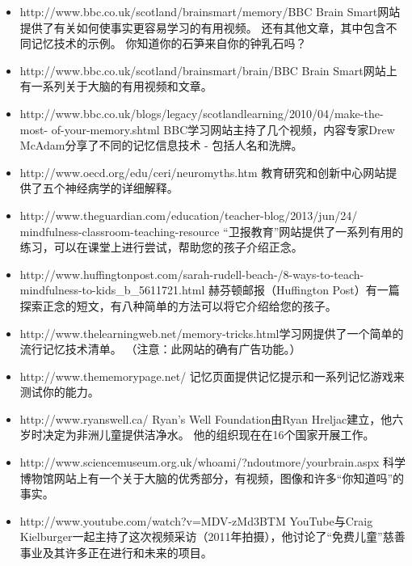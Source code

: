 \begin{itemize}
        \item http://www.bbc.co.uk/scotland/brainsmart/memory/BBC Brain Smart网站提供了有关如何使事实更容易学习的有用视频。 还有其他文章，其中包含不同记忆技术的示例。 你知道你的石笋来自你的钟乳石吗？
        \item http://www.bbc.co.uk/scotland/brainsmart/brain/BBC Brain Smart网站上有一系列关于大脑的有用视频和文章。
        \item http://www.bbc.co.uk/blogs/legacy/scotlandlearning/2010/04/make-the-most- of-your-memory.shtml BBC学习网站主持了几个视频，内容专家Drew McAdam分享了不同的记忆信息技术 - 包括人名和洗牌。
        \item http://www.oecd.org/edu/ceri/neuromyths.htm 教育研究和创新中心网站提供了五个神经病学的详细解释。
        \item http://www.theguardian.com/education/teacher-blog/2013/jun/24/ mindfulness-classroom-teaching-resource “卫报教育”网站提供了一系列有用的练习，可以在课堂上进行尝试，帮助您的孩子介绍正念。
        \item http://www.huffingtonpost.com/sarah-rudell-beach-/8-ways-to-teach- mindfulness-to-kids_b_5611721.html 赫芬顿邮报（Huffington Post）有一篇探索正念的短文，有八种简单的方法可以将它介绍给您的孩子。
        \item   http://www.thelearningweb.net/memory-tricks.html学习网提供了一个简单的流行记忆技术清单。 （注意：此网站的确有广告功能。）
        \item http://www.thememorypage.net/ 记忆页面提供记忆提示和一系列记忆游戏来测试你的能力。
        \item http://www.ryanswell.ca/ Ryan's Well Foundation由Ryan Hreljac建立，他六岁时决定为非洲儿童提供洁净水。 他的组织现在在16个国家开展工作。
        \item http://www.sciencemuseum.org.uk/whoami/?ndoutmore/yourbrain.aspx 科学博物馆网站上有一个关于大脑的优秀部分，有视频，图像和许多“你知道吗”的事实。
        \item http://www.youtube.com/watch?v=MDV-zMd3BTM YouTube与Craig Kielburger一起主持了这次视频采访（2011年拍摄），他讨论了“免费儿童”慈善事业及其许多正在进行和未来的项目。
     \end{itemize}   
